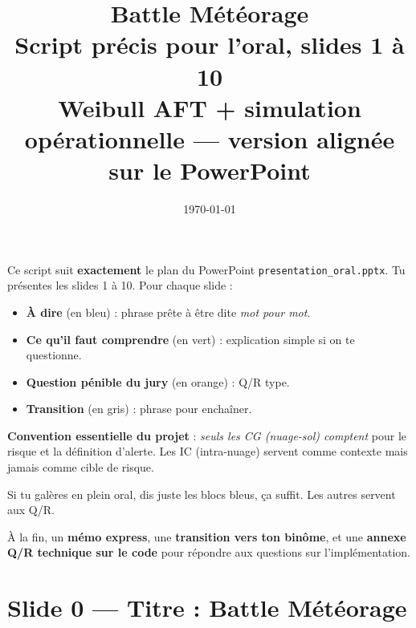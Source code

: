 \documentclass[11pt,a4paper]{article}
\title{
    \textbf{Battle Météorage} \\[0.4em]
    \large Script précis pour l'oral, slides 1 à 10 \\
    \small Weibull AFT + simulation opérationnelle — version alignée sur le PowerPoint
}
\author{}
\date{\today}
\begin{document}
\maketitle

\begin{tcolorbox}[colback=yellow!8,colframe=yellow!60!black,title=\textbf{Mode d'emploi}]
Ce script suit \textbf{exactement} le plan du PowerPoint \texttt{presentation\_oral.pptx}.
Tu présentes les slides 1 à 10. Pour chaque slide :
\begin{itemize}[topsep=2pt]
    \item \textbf{À dire} (en bleu) : phrase prête à être dite \emph{mot pour mot}.
    \item \textbf{Ce qu'il faut comprendre} (en vert) : explication simple si on te questionne.
    \item \textbf{Question pénible du jury} (en orange) : Q/R type.
    \item \textbf{Transition} (en gris) : phrase pour enchaîner.
\end{itemize}

\textbf{Convention essentielle du projet} : \emph{seuls les CG (nuage-sol) comptent} pour
le risque et la définition d'alerte. Les IC (intra-nuage) servent comme contexte mais
jamais comme cible de risque.

Si tu galères en plein oral, dis juste les blocs bleus, ça suffit. Les autres servent
aux Q/R.

À la fin, un \textbf{mémo express}, une \textbf{transition vers ton binôme}, et une
\textbf{annexe Q/R technique sur le code} pour répondre aux questions sur l'implémentation.
\end{tcolorbox}


\tableofcontents
\newpage

\section{Slide 0 — Titre : Battle Météorage}
\end{document}
